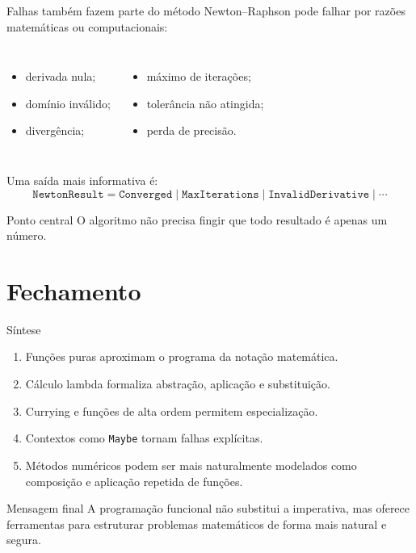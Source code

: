 \documentclass[aspectratio=169,11pt]{beamer}
\begin{document}
\begin{frame}{Falhas também fazem parte do método}
  Newton--Raphson pode falhar por razões matemáticas ou computacionais:

  \begin{columns}
    \begin{itemize}
      \item derivada nula;
      \item domínio inválido;
      \item divergência;
    \end{itemize}

    \begin{itemize}
      \item máximo de iterações;
      \item tolerância não atingida;
      \item perda de precisão.
    \end{itemize}
  \end{columns}

  \vspace{0.25cm}
  Uma saída mais informativa é:
  \begin{equation*}
    \texttt{NewtonResult}=\texttt{Converged}\mid\texttt{MaxIterations}\mid\texttt{InvalidDerivative}\mid\cdots
  \end{equation*}

  \begin{alertblock}{Ponto central}
    O algoritmo não precisa fingir que todo resultado é apenas um número.
  \end{alertblock}
\end{frame}

\section{Fechamento}

\begin{frame}{Síntese}
  \begin{enumerate}
    \item Funções puras aproximam o programa da notação matemática.
    \item Cálculo lambda formaliza abstração, aplicação e substituição.
    \item Currying e funções de alta ordem permitem especialização.
    \item Contextos como \texttt{Maybe} tornam falhas explícitas.
    \item Métodos numéricos podem ser mais naturalmente modelados como composição e aplicação repetida de funções.
  \end{enumerate}

  \vspace{0.2cm}
  \begin{block}{Mensagem final}
    A programação funcional não substitui a imperativa, mas oferece ferramentas para estruturar problemas matemáticos de forma mais natural e segura.
  \end{block}
\end{frame}
\end{document}

